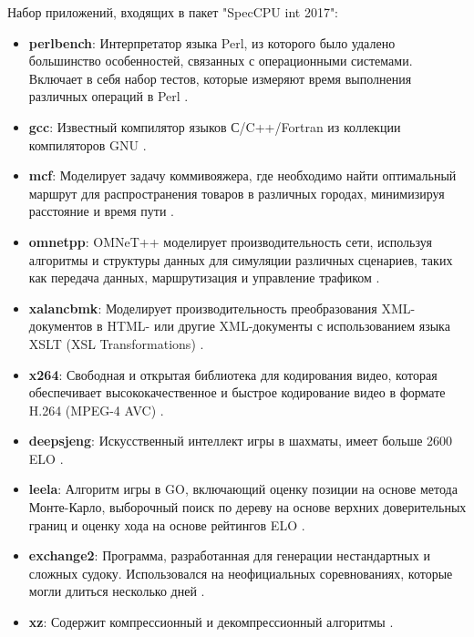 Набор приложений, входящих в пакет "SpecCPU int 2017"\phantom{}:
\begin{itemize}
		\item  \textbf{perlbench}:  Интерпретатор языка Perl, из которого было удалено большинство особенностей, связанных с операционными системами. Включает в себя набор тестов, которые измеряют время выполнения различных операций в Perl \cite{siever1998perl}.
		\item  \textbf{gcc}: Известный компилятор языков С/C++/Fortran из коллекции компиляторов GNU \cite{gough2004introduction}. 
		\item  \textbf{mcf}: Моделирует задачу коммивояжера, где необходимо найти оптимальный маршрут для распространения товаров в различных городах, минимизируя расстояние и время пути \cite{lobel1999solving}.
		\item  \textbf{omnetpp}: OMNeT++ моделирует производительность  сети, используя алгоритмы и структуры данных для симуляции различных сценариев, таких как передача данных, маршрутизация и управление трафиком \cite{varga2019practical}.
		\item  \textbf{xalancbmk}: Моделирует производительность преобразования XML-документов в HTML- или другие XML-документы с использованием языка XSLT (XSL Transformations) \cite{euzenat2002xml}.
		\item  \textbf{x264}: Свободная и открытая библиотека для кодирования видео, которая обеспечивает высококачественное и быстрое кодирование видео в формате H.264 (MPEG-4 AVC) \cite{merritt2006x264}.
		\item  \textbf{deepsjeng}: Искусственный интеллект игры в шахматы, имеет больше 2600 ELO  \cite{sandin2021ssdf}.
		\item  \textbf{leela}: Алгоритм игры в GO, включающий оценку позиции на основе метода Монте-Карло, выборочный поиск по дереву на основе верхних доверительных границ и оценку хода на основе рейтингов ELO \cite{choi2022does} .
		\item  \textbf{exchange2}: Программа, разработанная для генерации нестандартных и сложных судоку. Использовался на неофициальных соревнованиях, которые могли длиться несколько дней \cite{10.1145/1124708.1124709}. 
		\item  \textbf{xz}: Содержит компрессионный и декомпрессионный алгоритмы \cite{koranne2011compression}. 
\end{itemize}

